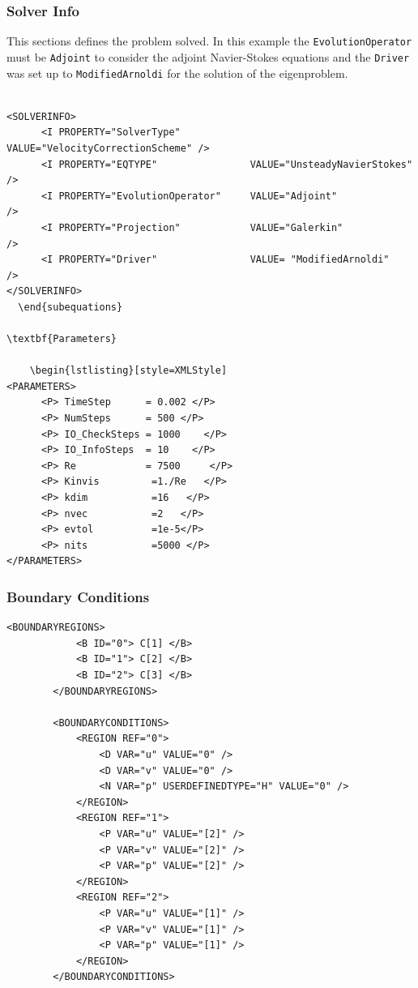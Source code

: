  \subsubsection{Solver Info}

 This sections defines the problem solved. In this example the \texttt{EvolutionOperator} must be \texttt{Adjoint} to consider the adjoint Navier-Stokes equations and the \texttt{Driver} was set up to \texttt{ModifiedArnoldi} for the solution of the eigenproblem.

    \begin{lstlisting}[style=XMLStyle]

<SOLVERINFO>
      <I PROPERTY="SolverType"            VALUE="VelocityCorrectionScheme" />
      <I PROPERTY="EQTYPE"                VALUE="UnsteadyNavierStokes"     />
      <I PROPERTY="EvolutionOperator"     VALUE="Adjoint"                  />
      <I PROPERTY="Projection"            VALUE="Galerkin"                 />
      <I PROPERTY="Driver"                VALUE= "ModifiedArnoldi"         />
</SOLVERINFO>
  \end{subequations}

\textbf{Parameters}

    \begin{lstlisting}[style=XMLStyle]
<PARAMETERS>
      <P> TimeStep      = 0.002 </P>
      <P> NumSteps      = 500 </P>
      <P> IO_CheckSteps = 1000    </P>
      <P> IO_InfoSteps  = 10    </P>
      <P> Re            = 7500     </P>
      <P> Kinvis         =1./Re   </P>
      <P> kdim           =16   </P>
      <P> nvec           =2   </P>
      <P> evtol          =1e-5</P>
      <P> nits           =5000 </P>
</PARAMETERS>
  \end{lstlisting}

\subsubsection{Boundary Conditions}

    \begin{lstlisting}[style=XMLStyle]
 <BOUNDARYREGIONS>
            <B ID="0"> C[1] </B>
            <B ID="1"> C[2] </B>
            <B ID="2"> C[3] </B>
        </BOUNDARYREGIONS>

        <BOUNDARYCONDITIONS>
            <REGION REF="0">
                <D VAR="u" VALUE="0" />
                <D VAR="v" VALUE="0" />
                <N VAR="p" USERDEFINEDTYPE="H" VALUE="0" />
            </REGION>
            <REGION REF="1">
                <P VAR="u" VALUE="[2]" />
                <P VAR="v" VALUE="[2]" />
                <P VAR="p" VALUE="[2]" />
            </REGION>
            <REGION REF="2">
                <P VAR="u" VALUE="[1]" />
                <P VAR="v" VALUE="[1]" />
                <P VAR="p" VALUE="[1]" />
            </REGION>
        </BOUNDARYCONDITIONS>
  \end{lstlisting}



